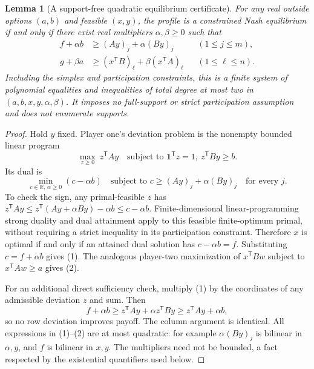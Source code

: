 \documentclass[11pt]{article}
\newtheorem{lemma}{Lemma}
\theoremstyle{definition}
\theoremstyle{remark}
\begin{document}
\begin{lemma}[A support-free quadratic equilibrium certificate]
\label{lem:mixed-dual}
For any real outside options $(a,b)$ and feasible $(x,y)$, the profile is a
constrained Nash equilibrium if and only if there exist real multipliers
$\alpha,\beta\geq0$ such that
\begin{align}
 f+\alpha b&\geq (Ay)_j+\alpha(By)_j
                    &&(1\leq j\leq m),                 \tag{1}\\
 g+\beta a&\geq (x^{\mathsf T}B)_\ell
                         +\beta(x^{\mathsf T}A)_\ell
                    &&(1\leq\ell\leq n).              \tag{2}
\end{align}
Including the simplex and participation constraints, this is a finite
system of polynomial equalities and inequalities of total degree at most
two in $(a,b,x,y,\alpha,\beta)$. It imposes no full-support or strict
participation assumption and does not enumerate supports.
\end{lemma}
\begin{proof}
Hold $y$ fixed. Player one's deviation problem is the nonempty bounded
linear program
\[
 \max_{z\geq0}\ z^{\mathsf T}Ay
 \quad\text{subject to }\mathbf1^{\mathsf T}z=1,
                           \ z^{\mathsf T}By\geq b.
\]
Its dual is
\[
 \min_{c\in\mathbb R,\,\alpha\geq0}(c-\alpha b)
 \quad\text{subject to }c\geq(Ay)_j+\alpha(By)_j
                         \quad\text{for every }j.
\]
To check the sign, any primal-feasible $z$ has
$z^{\mathsf T}Ay\leq z^{\mathsf T}(Ay+\alpha By)-\alpha b
\leq c-\alpha b$. Finite-dimensional linear-programming strong duality
and dual attainment apply to this feasible finite-optimum primal, without
requiring a strict inequality in its participation constraint.
Therefore $x$ is optimal if and only if an attained dual solution has
$c-\alpha b=f$. Substituting $c=f+\alpha b$ gives (1).
The analogous player-two maximization of $x^{\mathsf T}Bw$ subject to
$x^{\mathsf T}Aw\geq a$ gives (2).

For an additional direct sufficiency check, multiply (1) by the
coordinates of any admissible deviation $z$ and sum. Then
\[
 f+\alpha b\geq z^{\mathsf T}Ay+\alpha z^{\mathsf T}By
 \geq z^{\mathsf T}Ay+\alpha b,
\]
so no row deviation improves payoff. The column argument is identical.
All expressions in (1)--(2) are at most quadratic: for example
$\alpha(By)_j$ is bilinear in $\alpha,y$, and $f$ is bilinear in $x,y$.
The multipliers need not be bounded, a fact respected by the existential
quantifiers used below.
\end{proof}
\end{document}
